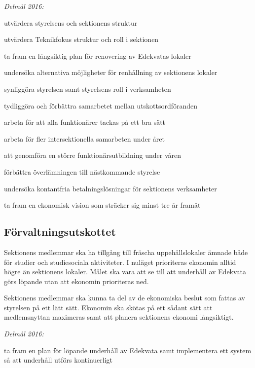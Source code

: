 \documentclass[../_main/handlingar.tex]{subfiles}
\begin{document}
\emph{Delmål 2016:}
\begin{dashlist}
    \item utvärdera styrelsens och sektionens struktur
    \item utvärdera Teknikfokus struktur och roll i sektionen
    \item ta fram en långsiktig plan för renovering av Edekvatas lokaler
    \item undersöka alternativa möjligheter för renhållning av sektionens lokaler
    \item synliggöra styrelsen samt styrelsens roll i verksamheten
    \item tydliggöra och förbättra samarbetet mellan utskottsordföranden
    \item arbeta för att alla funktionärer tackas på ett bra sätt
    \item arbeta för fler intersektionella samarbeten under året
    \item att genomföra en större funktionärsutbildning under våren
    \item förbättra överlämningen till nästkommande styrelse
    \item undersöka kontantfria betalningslösningar för sektionens verksamheter
    \item ta fram en ekonomisk vision som sträcker sig minst tre år framåt
\end{dashlist}

\subsection*{Förvaltningsutskottet}
Sektionens medlemmar ska ha tillgång till fräscha uppehållslokaler ämnade både för studier och studiesociala aktiviteter. I nuläget prioriteras ekonomin alltid högre än sektionens lokaler. Målet ska vara att se till att underhåll av Edekvata görs löpande utan att ekonomin prioriteras ned.

Sektionens medlemmar ska kunna ta del av de ekonomiska beslut som fattas av styrelsen på ett lätt sätt. Ekonomin ska skötas på ett sådant sätt att medlemsnyttan maximeras samt att planera sektionens ekonomi långsiktigt.

\emph{Delmål 2016:}
\begin{dashlist}
    \item ta fram en plan för löpande underhåll av Edekvata samt implementera ett system så att underhåll utförs kontinuerligt
\end{dashlist}
\end{document}
